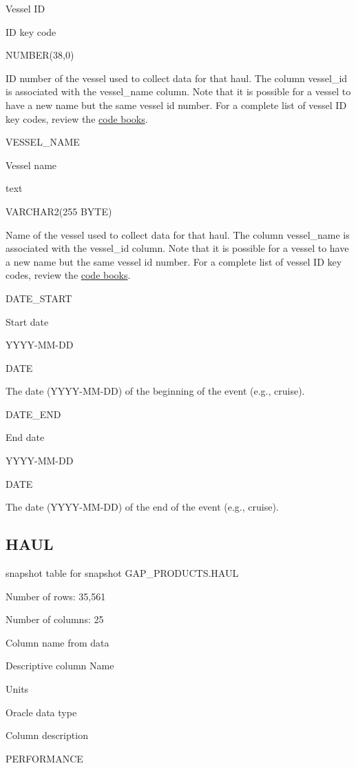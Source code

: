 \documentclass[
  letterpaper,
  oneside,
  open=any]{scrbook}
\begin{document}
Vessel ID

ID key code

NUMBER(38,0)

ID number of the vessel used to collect data for that haul. The column
vessel\_id is associated with the vessel\_name column. Note that it is
possible for a vessel to have a new name but the same vessel id number.
For a complete list of vessel ID key codes, review the
\href{https://www.fisheries.noaa.gov/resource/document/groundfish-survey-species-code-manual-and-data-codes-manual}{code
books}.

VESSEL\_NAME

Vessel name

text

VARCHAR2(255 BYTE)

Name of the vessel used to collect data for that haul. The column
vessel\_name is associated with the vessel\_id column. Note that it is
possible for a vessel to have a new name but the same vessel id number.
For a complete list of vessel ID key codes, review the
\href{https://www.fisheries.noaa.gov/resource/document/groundfish-survey-species-code-manual-and-data-codes-manual}{code
books}.

DATE\_START

Start date

YYYY-MM-DD

DATE

The date (YYYY-MM-DD) of the beginning of the event (e.g., cruise).

DATE\_END

End date

YYYY-MM-DD

DATE

The date (YYYY-MM-DD) of the end of the event (e.g., cruise).

\subsection{HAUL}\label{haul}

snapshot table for snapshot GAP\_PRODUCTS.HAUL

Number of rows: 35,561

Number of columns: 25

Column name from data

Descriptive column Name

Units

Oracle data type

Column description

PERFORMANCE
\end{document}
